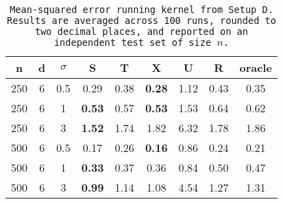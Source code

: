\begin{table}[ht]
\centering
\begin{tabular}{ccccccccc}
  \hline
n & d & $\sigma$ & S & T & X & U & R & oracle \\ 
  \hline
250 & 6 & 0.5 & 0.29 & 0.38 & \bf 0.28 &  1.12 & 0.43 & 0.35 \\ 
  250 & 6 & 1 & \bf 0.53 & 0.57 & \bf 0.53 &  1.53 & 0.64 & 0.62 \\ 
  250 & 6 & 3 & \bf 1.52 & 1.74 & 1.82 &  6.32 & 1.78 & 1.86 \\ 
  500 & 6 & 0.5 & 0.17 & 0.26 & \bf 0.16 &  0.86 & 0.24 & 0.21 \\ 
  500 & 6 & 1 & \bf 0.33 & 0.37 & 0.36 &  0.84 & 0.50 & 0.47 \\ 
  500 & 6 & 3 & \bf 0.99 & 1.14 & 1.08 &  4.54 & 1.27 & 1.31 \\ 
   \hline
\end{tabular}
\caption{\tt Mean-squared error running \texttt{kernel} from Setup D. Results are averaged across 100 runs, rounded to two decimal places, and reported on an independent test set of size $n$.} 
\label{table:setup4}
\end{table}
